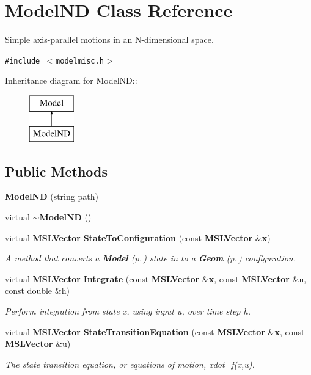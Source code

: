 \section{Model\-ND  Class Reference}
\label{classModelND}
Simple axis-parallel motions in an N-dimensional space. 


{\tt \#include $<$modelmisc.h$>$}

Inheritance diagram for Model\-ND::\begin{figure}[H]
\begin{center}
\leavevmode
\includegraphics[height=2cm]{classModelND}
\end{center}
\end{figure}
\subsection*{Public Methods}
\begin{CompactItemize}
\item 
{\bf Model\-ND} (string path)
\item 
virtual {\bf $\sim$Model\-ND} ()
\item 
virtual {\bf MSLVector} {\bf State\-To\-Configuration} (const {\bf MSLVector} \&{\bf x})
\begin{CompactList}\small\item\em A method that converts a {\bf Model} {\rm (p.\,\pageref{classModel})} state in to a {\bf Geom} {\rm (p.\,\pageref{classGeom})} configuration.\item\end{CompactList}\item 
virtual {\bf MSLVector} {\bf Integrate} (const {\bf MSLVector} \&{\bf x}, const {\bf MSLVector} \&u, const double \&h)
\begin{CompactList}\small\item\em Perform integration from state x, using input u, over time step h.\item\end{CompactList}\item 
virtual {\bf MSLVector} {\bf State\-Transition\-Equation} (const {\bf MSLVector} \&{\bf x}, const {\bf MSLVector} \&u)
\begin{CompactList}\small\item\em The state transition equation, or equations of motion, xdot=f(x,u).\item\end{CompactList}\end{CompactItemize}
